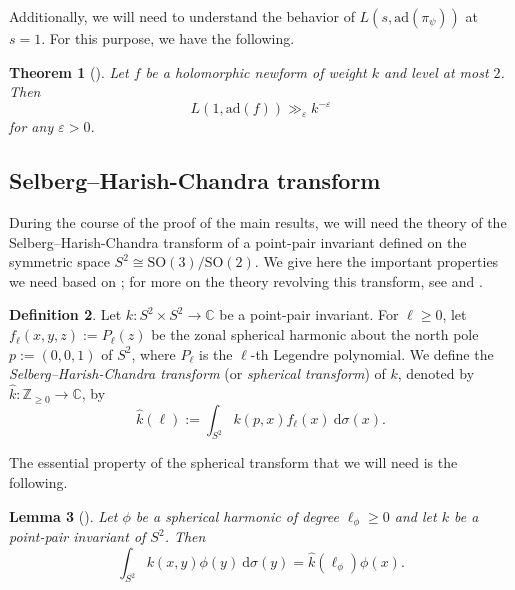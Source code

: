 \documentclass[11pt]{amsart}
\newtheorem{theorem}{Theorem}[section]
\newtheorem{lemma}[theorem]{Lemma}
\theoremstyle{definition}
\newtheorem{definition}[theorem]{Definition}
\begin{document}
Additionally, we will need to understand the behavior of $L(s,\mathrm{ad}(\pi_{\psi}))$ at $s=1$. For this purpose, we have the following.

\begin{theorem}[{\cite[Thm.~0.2]{AdjointBound}}]\label{AdjointBound}
Let $f$ be a holomorphic newform of weight $k$ and level at most $2$. Then $$ L(1,\mathrm{ad}(f)) \gg_{\varepsilon} k^{-\varepsilon}$$ for any $\varepsilon>0$.
\end{theorem}









\subsection{Selberg--Harish-Chandra transform}

During the course of the proof of the main results, we will need the theory of the Selberg--Harish-Chandra transform of a point-pair invariant defined on the symmetric space $S^2 \cong \mathrm{SO}(3)/\mathrm{SO}(2)$. We give here the important properties we need based on \cite[\S 2.2]{HumphriesRadziwill}; for more on the theory revolving this transform, see \cite[\S 2]{LubPhiSarI} and \cite{Selberg1956}.

\begin{definition}
Let $k : S^2 \times S^2 \rightarrow \mathbb{C}$ be a point-pair invariant. For $\ell\geq 0$, let $f_{\ell}(x,y,z) := P_{\ell}(z)$ be the zonal spherical harmonic about the north pole $p:=(0,0,1)$ of $S^2$, where $P_{\ell}$ is the $\ell$-th Legendre polynomial. We define the \textit{Selberg--Harish-Chandra transform} (or \textit{spherical transform}) of $k$, denoted by $\widehat{k}:\mathbb{Z}_{\geq 0} \rightarrow \mathbb{C}$, by $$ \widehat{k}(\ell) := \int_{S^2} k(p,x) f_{\ell}(x) \: \mathrm{d}\sigma(x).$$
\end{definition}

The essential property of the spherical transform that we will need is the following.

\begin{lemma}[{\cite[Lemma 2.2]{HumphriesRadziwill}}]\label{LemmaIntPointPairFunction}
Let $\phi$ be a spherical harmonic of degree $\ell_{\phi} \geq 0$ and let $k$ be a point-pair invariant of $S^2$. Then $$ \int_{S^2} k(x,y) \phi(y) \: \mathrm{d}\sigma(y) = \widehat{k}(\ell_{\phi}) \phi(x).$$
\end{lemma}
\end{document}
